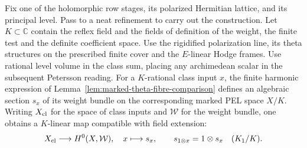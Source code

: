 \begin{auxlemma}
\label{lem:marked-class-section-descent}
Fix one of the holomorphic row stages, its polarized Hermitian
lattice, and its principal level. Pass to a neat refinement to
carry out the construction. Let \(K\subset\mathbb C\) contain the
reflex field and the fields of definition of the weight, the finite
test and the definite coefficient space. Use the rigidified
polarization line, its theta structures on the prescribed finite
cover and the \(E\)-linear Hodge frames. Use rational level volume
in the class sum, placing any archimedean scalar in the subsequent
Petersson reading. For a \(K\)-rational class input \(x\), the finite
harmonic expression of Lemma~\ref{lem:marked-theta-fibre-comparison}
defines an algebraic section \(s_x\) of its weight bundle on the
corresponding marked PEL space \(X/K\). Writing \(X_{\rm cl}\)
for the space of class inputs and \(\mathcal W\) for the weight bundle,
one obtains a \(K\)-linear map compatible with field extension:
\[
 X_{\rm cl}\longrightarrow H^0(X,\mathcal W),\quad x\longmapsto s_x,
 \qquad s_{1\otimes x}=1\otimes s_x\quad(K_1/K).
\]
\end{auxlemma}
